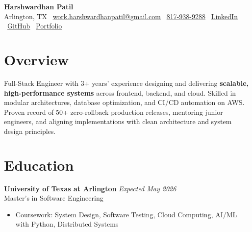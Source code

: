 \documentclass[10pt, letterpaper]{article}
\newenvironment{highlights}{\begin{itemize}[topsep=0.05cm,parsep=0.05cm,partopsep=0pt,itemsep=2pt,leftmargin=10pt]}{\end{itemize}}
\begin{document}
\begin{center}
    {\fontsize{20pt}{20pt}\selectfont \textbf{Harshwardhan Patil}} \\[6pt]
    \faMapMarker* Arlington, TX \hspace{1.2em}
    \faEnvelope\ \href{mailto:work.harshwardhanpatil@gmail.com}{work.harshwardhanpatil@gmail.com} \hspace{1.2em}
    \faPhone\ \href{tel:8179389288}{817-938-9288} \hspace{1.2em}
    \faLinkedin\ \href{https://www.linkedin.com/in/harshwardhanpatil23/}{LinkedIn} \hspace{1.2em}
    \faGithub\ \href{https://github.com/buffden}{GitHub} \hspace{1.2em}
    \faGlobe\ \href{https://buffden.github.io/buffden-portfolio/}{Portfolio}
\end{center}

\section{Overview}
Full-Stack Engineer with 3+ years’ experience designing and delivering \textbf{scalable, high-performance systems} across frontend, backend, and cloud. Skilled in modular architectures, database optimization, and CI/CD automation on AWS. Proven record of 50+ zero-rollback production releases, mentoring junior engineers, and aligning implementations with clean architecture and system design principles.

\section{Education}
\textbf{University of Texas at Arlington} \hfill \textit{Expected May 2026} \\
Master’s in Software Engineering
\begin{highlights}
  \item Coursework: System Design, Software Testing, Cloud Computing, AI/ML with Python, Distributed Systems
\end{highlights}

\end{document}
